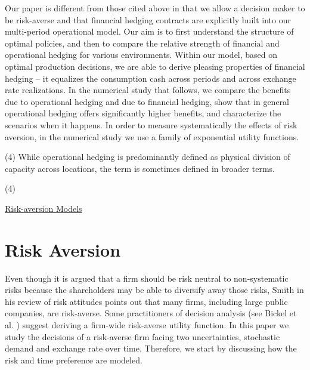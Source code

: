 \documentclass[mnsc,nonblindrev,copyedit]{informs2_wz} %
\begin{document}
\medskip



\medskip

Our paper is different from those cited above in that we allow a decision maker to be risk-averse and that financial hedging contracts are explicitly built into our multi-period operational model.  Our aim is to first understand the structure of optimal policies, and then to compare the relative strength of financial and operational hedging for various environments.  Within our model, based on optimal production decisions, we are able to derive pleasing properties of financial hedging -- it equalizes the consumption cash across periods and across exchange rate realizations. In the numerical study that follows, we compare the benefits due to operational hedging and due to financial hedging, show that in general operational hedging offers significantly higher benefits, and characterize the scenarios when it happens.  In order to measure systematically the effects of risk aversion, in the numerical study we use a family of exponential utility functions.










\medskip



(4) While operational hedging is predominantly defined as physical division of capacity across locations, the term is sometimes defined in broader terms.  


(4) 



\noindent \underline{Risk-aversion Models}


\section{Risk Aversion}

Even though it is argued that a firm should be risk neutral to non-systematic risks because the shareholders may be able to diversify away those risks, Smith \cite{Smith2004} in his review of risk attitudes points out that many firms, including large public companies, are risk-averse.  Some practitioners of decision analysis (see Bickel et al.  \cite{Bickel2002}) suggest deriving a firm-wide risk-averse utility function.  In this paper we study the decisions of a risk-averse firm facing two uncertainties, stochastic demand and exchange rate over time.  
Therefore, we start by discussing how the risk and time preference are modeled.
\end{document}
